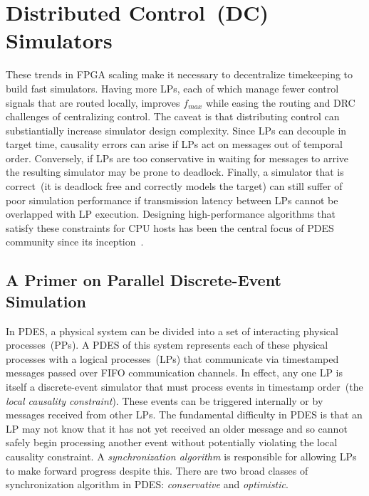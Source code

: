 \section{Distributed Control~(DC) Simulators}
These trends in FPGA scaling make it necessary to decentralize timekeeping to
build fast simulators. Having more LPs, each of which manage fewer control
signals that are routed locally, improves ${f_{max}}$ while easing the routing and
DRC challenges of centralizing control. The caveat is that distributing control
can substiantially increase simulator design complexity. Since LPs can decouple in target time,
causality errors can arise if LPs act on messages out of temporal order. Conversely, if LPs are too
conservative in waiting for messages to arrive the resulting simulator may be prone to deadlock.
Finally, a simulator that is correct~(it is deadlock free and correctly models
the target) can still suffer of poor simulation performance if transmission
latency between LPs cannot be overlapped with LP execution. Designing
high-performance algorithms that satisfy these constraints for CPU hosts has
been the central focus of PDES community since its
inception~\cite{PDESFujimotoPrimer}.

\subsection{A Primer on Parallel Discrete-Event Simulation}

In PDES, a physical system can be divided into a set of interacting physical processes~(PPs). A PDES of this system
represents each of these physical processes with a logical processes~(LPs) that communicate via timestamped messages passed over
FIFO communication channels.  In effect, any one LP is itself a discrete-event simulator that must process events in timestamp order~(the
\emph{local causality constraint}). These events can be triggered internally or
by messages received from other LPs. The fundamental difficulty in PDES is that
an LP may not know that it has not yet received an older message and so cannot
safely begin processing another event without potentially violating the local
causality constraint. A \emph{synchronization algorithm} is responsible for
allowing LPs to make forward progress despite this. There are two broad classes of synchronization algorithm in PDES:
\emph{conservative} and \emph{optimistic}.

